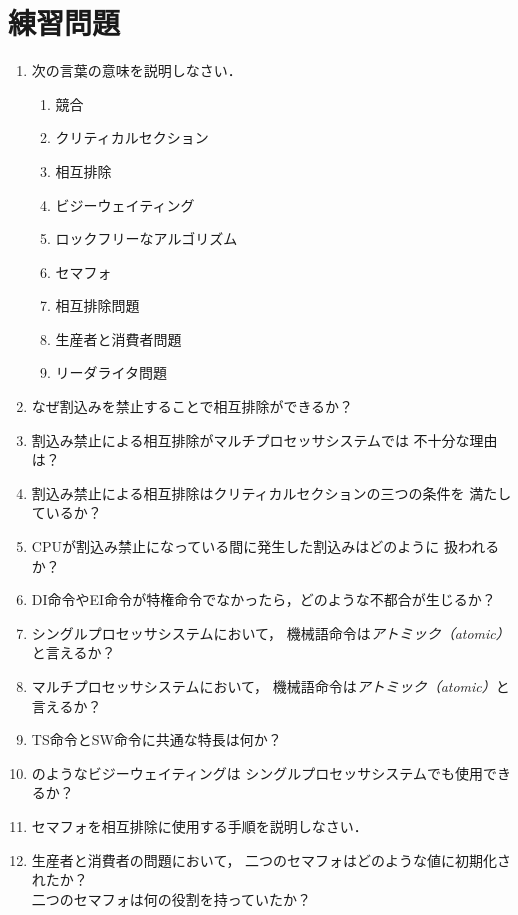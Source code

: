 \section*{練習問題}
\begin{enumerate}
  \renewcommand{\labelenumi}{\ttfamily\arabic{chapter}.\arabic{enumi}}
  \setlength{\leftskip}{1em}
\item 次の言葉の意味を説明しなさい．
  \begin{enumerate}
  \item 競合
  \item クリティカルセクション
  \item 相互排除
  \item ビジーウェイティング
  \item ロックフリーなアルゴリズム
  \item セマフォ
  \item 相互排除問題
  \item 生産者と消費者問題
  \item リーダライタ問題
  \end{enumerate}
\item なぜ割込みを禁止することで相互排除ができるか？
\item 割込み禁止による相互排除がマルチプロセッサシステムでは
  不十分な理由は？
\item 割込み禁止による相互排除はクリティカルセクションの三つの条件を
  満たしているか？
\item CPUが割込み禁止になっている間に発生した割込みはどのように
  扱われるか？
\item DI命令やEI命令が特権命令でなかったら，どのような不都合が生じるか？
\item シングルプロセッサシステムにおいて，
  機械語命令は\emph{アトミック（atomic）}と言えるか？
\item マルチプロセッサシステムにおいて，
  機械語命令は\emph{アトミック（atomic）}と言えるか？
\item TS命令とSW命令に共通な特長は何か？
\item {}のようなビジーウェイティングは
  シングルプロセッサシステムでも使用できるか？
\item セマフォを相互排除に使用する手順を説明しなさい．
\item 生産者と消費者の問題において，
  二つのセマフォはどのような値に初期化されたか？\\
  二つのセマフォは何の役割を持っていたか？
\end{enumerate}

